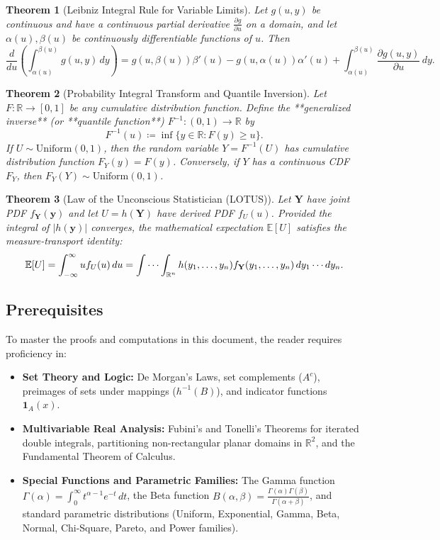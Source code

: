 \documentclass[11pt, letterpaper]{article}
\newtheorem{theorem}{Theorem}[section]
\theoremstyle{definition}
\theoremstyle{remark}
\newcommand{\R}{\mathbb{R}}
\newcommand{\E}{\mathbb{E}}
\begin{document}
\begin{theorem}[Leibniz Integral Rule for Variable Limits]
Let $g(u, y)$ be continuous and have a continuous partial derivative $\frac{\partial g}{\partial u}$ on a domain, and let $\alpha(u), \beta(u)$ be continuously differentiable functions of $u$. Then
\[
    \frac{d}{du} \left( \int_{\alpha(u)}^{\beta(u)} g(u, y) \, dy \right) = g(u, \beta(u))\beta'(u) - g(u, \alpha(u))\alpha'(u) + \int_{\alpha(u)}^{\beta(u)} \frac{\partial g(u, y)}{\partial u} \, dy.
\]
\end{theorem}

\begin{theorem}[Probability Integral Transform and Quantile Inversion]
Let $F : \R \to [0, 1]$ be any cumulative distribution function. Define the **generalized inverse** (or **quantile function**) $F^{-1} : (0, 1) \to \R$ by
\[
    F^{-1}(u) \coloneqq \inf \{ y \in \R : F(y) \ge u \}.
\]
If $U \sim \text{Uniform}(0, 1)$, then the random variable $Y = F^{-1}(U)$ has cumulative distribution function $F_Y(y) = F(y)$. Conversely, if $Y$ has a continuous CDF $F_Y$, then $F_Y(Y) \sim \text{Uniform}(0, 1)$.
\end{theorem}

\begin{theorem}[Law of the Unconscious Statistician (LOTUS)]
Let $\mathbf{Y}$ have joint PDF $f_{\mathbf{Y}}(\mathbf{y})$ and let $U = h(\mathbf{Y})$ have derived PDF $f_U(u)$. Provided the integral of $|h(\mathbf{y})|$ converges, the mathematical expectation $\E[U]$ satisfies the measure-transport identity:
\[
    \E[U] = \int_{-\infty}^{\infty} u f_U(u) \, du = \idotsint_{\R^n} h(y_1, \dots, y_n) f_{\mathbf{Y}}(y_1, \dots, y_n) \, dy_1 \cdots dy_n.
\]
\end{theorem}

\subsection{Prerequisites}

To master the proofs and computations in this document, the reader requires proficiency in:
\begin{itemize}
    \item \textbf{Set Theory and Logic:} De Morgan's Laws, set complements ($A^c$), preimages of sets under mappings ($h^{-1}(B)$), and indicator functions $\mathbf{1}_A(x)$.
    \item \textbf{Multivariable Real Analysis:} Fubini's and Tonelli's Theorems for iterated double integrals, partitioning non-rectangular planar domains in $\R^2$, and the Fundamental Theorem of Calculus.
    \item \textbf{Special Functions and Parametric Families:} The Gamma function $\Gamma(\alpha) = \int_0^\infty t^{\alpha-1}e^{-t}\,dt$, the Beta function $B(\alpha, \beta) = \frac{\Gamma(\alpha)\Gamma(\beta)}{\Gamma(\alpha+\beta)}$, and standard parametric distributions (Uniform, Exponential, Gamma, Beta, Normal, Chi-Square, Pareto, and Power families).
\end{itemize}
\end{document}
